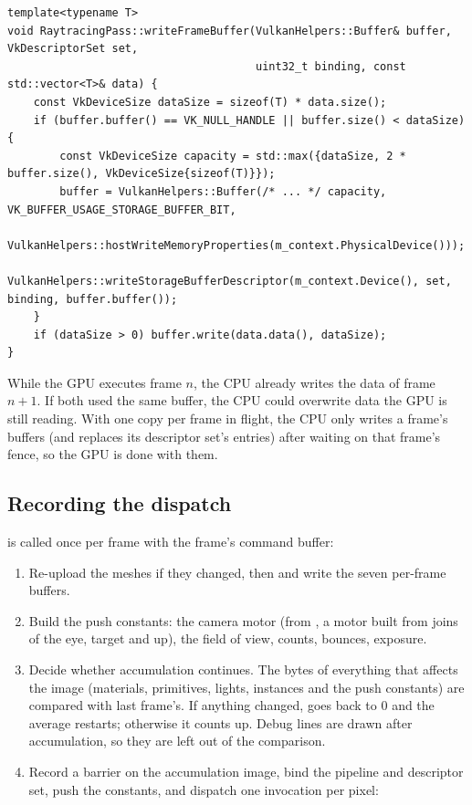 \documentclass[11pt,a4paper]{article}
\begin{document}
\begin{lstlisting}
template<typename T>
void RaytracingPass::writeFrameBuffer(VulkanHelpers::Buffer& buffer, VkDescriptorSet set,
                                      uint32_t binding, const std::vector<T>& data) {
    const VkDeviceSize dataSize = sizeof(T) * data.size();
    if (buffer.buffer() == VK_NULL_HANDLE || buffer.size() < dataSize) {
        const VkDeviceSize capacity = std::max({dataSize, 2 * buffer.size(), VkDeviceSize{sizeof(T)}});
        buffer = VulkanHelpers::Buffer(/* ... */ capacity, VK_BUFFER_USAGE_STORAGE_BUFFER_BIT,
                                       VulkanHelpers::hostWriteMemoryProperties(m_context.PhysicalDevice()));
        VulkanHelpers::writeStorageBufferDescriptor(m_context.Device(), set, binding, buffer.buffer());
    }
    if (dataSize > 0) buffer.write(data.data(), dataSize);
}
\end{lstlisting}

\begin{keyidea}
While the GPU executes frame $n$, the CPU already writes the data of frame $n+1$. If both used the same buffer, the CPU could overwrite data the GPU is still reading. With one copy per frame in flight, the CPU only writes a frame's buffers (and replaces its descriptor set's entries) after waiting on that frame's fence, so the GPU is done with them.
\end{keyidea}

\subsection{Recording the dispatch}

 is called once per frame with the frame's command buffer:

\begin{enumerate}
  \item Re-upload the meshes if they changed, then  and write the seven per-frame buffers.
  \item Build the push constants: the camera motor (from , a motor built from joins of the eye, target and up), the field of view, counts, bounces, exposure.
  \item Decide whether accumulation continues. The bytes of everything that affects the image (materials, primitives, lights, instances and the push constants) are compared with last frame's. If anything changed,  goes back to 0 and the average restarts; otherwise it counts up. Debug lines are drawn after accumulation, so they are left out of the comparison.
  \item Record a barrier on the accumulation image, bind the pipeline and descriptor set, push the constants, and dispatch one invocation per pixel:
\end{enumerate}
\end{document}
